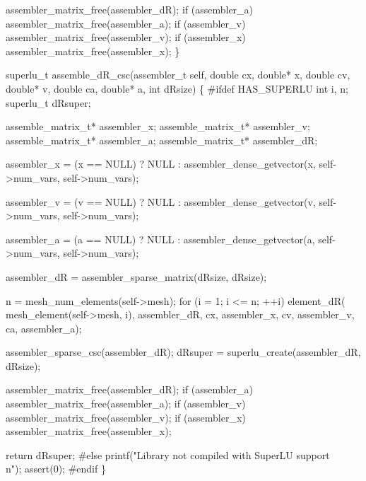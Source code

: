     assembler_matrix_free(assembler_dR);
    if (assembler_a) assembler_matrix_free(assembler_a);
    if (assembler_v) assembler_matrix_free(assembler_v);
    if (assembler_x) assembler_matrix_free(assembler_x);
\}

\nwendcode{}\nwdocspar

\nwenddocs{}\plusendmoddef
superlu_t assemble_dR_csc(assembler_t self,
                          double cx, double* x, 
                          double cv, double* v, 
                          double ca, double* a,
                          int dRsize)
\{
#ifdef HAS_SUPERLU
    int i, n;
    superlu_t dRsuper;

    assemble_matrix_t* assembler_x;
    assemble_matrix_t* assembler_v;
    assemble_matrix_t* assembler_a;
    assemble_matrix_t* assembler_dR;

    assembler_x = (x == NULL) ? NULL : 
        assembler_dense_getvector(x, self->num_vars, self->num_vars);

    assembler_v = (v == NULL) ? NULL : 
        assembler_dense_getvector(v, self->num_vars, self->num_vars);

    assembler_a = (a == NULL) ? NULL : 
        assembler_dense_getvector(a, self->num_vars, self->num_vars);

    assembler_dR = 
        assembler_sparse_matrix(dRsize, dRsize);

    n = mesh_num_elements(self->mesh);
    for (i = 1; i <= n; ++i)
        element_dR( mesh_element(self->mesh, i), assembler_dR, 
                    cx, assembler_x,
                    cv, assembler_v,
                    ca, assembler_a);

    assembler_sparse_csc(assembler_dR);
    dRsuper = superlu_create(assembler_dR, dRsize);

    assembler_matrix_free(assembler_dR);
    if (assembler_a) assembler_matrix_free(assembler_a);
    if (assembler_v) assembler_matrix_free(assembler_v);
    if (assembler_x) assembler_matrix_free(assembler_x);

    return dRsuper;
#else
    printf("Library not compiled with SuperLU support\\n");
    assert(0);
#endif
\}

\nwendcode{}

